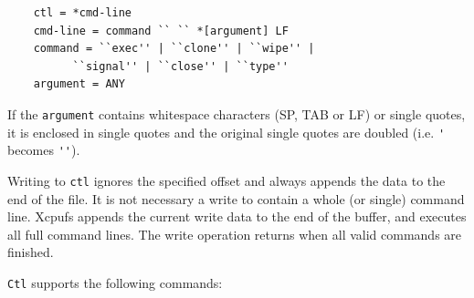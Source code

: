 \documentclass[11pt]{p9article}
\begin{document}
\begin{verbatim}
	ctl = *cmd-line
	cmd-line = command `` `` *[argument] LF
	command = ``exec'' | ``clone'' | ``wipe'' | 
		  ``signal'' | ``close'' | ``type''
	argument = ANY
\end{verbatim}

If the \verb|argument| contains whitespace characters (SP, TAB or LF) or single
quotes, it is enclosed in single quotes and the original single quotes are
doubled (i.e. \verb|'| becomes \verb|''|).

Writing to \verb|ctl| ignores the specified offset and always appends the
data to the end of the file. It is not necessary a write to contain a whole
(or single) command line. Xcpufs appends the current write data to the end
of the buffer, and executes all full command lines. The write operation
returns when all valid commands are finished.

\verb|Ctl| supports the following commands:
\end{document}

